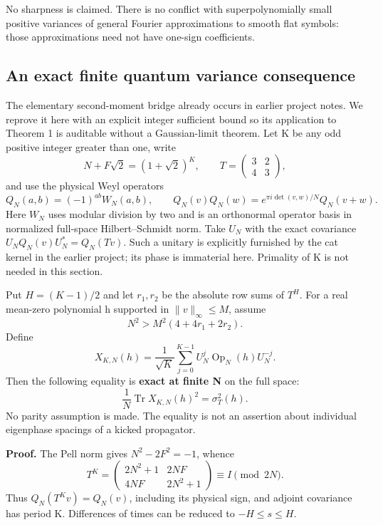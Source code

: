 \] No sharpness is claimed. There is no conflict with superpolynomially small positive variances of general Fourier approximations to smooth flat symbols: those approximations need not have one-sign coefficients.

\subsection{An exact finite quantum variance consequence}\label{nondegeneracy:an-exact-finite-quantum-variance-consequence}

The elementary second-moment bridge already occurs in earlier project notes. We reprove it here with an explicit integer sufficient bound so its application to Theorem 1 is auditable without a Gaussian-limit theorem. Let K be any odd positive integer greater than one, write \[
 N+F\sqrt2=(1+\sqrt2)^K,
 \qquad T=\begin{pmatrix}3&2\\4&3\end{pmatrix},
\] and use the physical Weyl operators \[
 Q_N(a,b)=(-1)^{ab}W_N(a,b),\qquad
 Q_N(v)Q_N(w)=e^{\pi i\det(v,w)/N}Q_N(v+w).
\] Here \(W_N\) uses modular division by two and is an orthonormal operator basis in normalized full-space Hilbert--Schmidt norm. Take \(U_N\) with the exact covariance \(U_NQ_N(v)U_N^*=Q_N(Tv)\). Such a unitary is explicitly furnished by the cat kernel in the earlier project; its phase is immaterial here. Primality of K is not needed in this section.

Put \(H=(K-1)/2\) and let \(r_1,r_2\) be the absolute row sums of \(T^H\). For a real mean-zero polynomial h supported in \(\|v\|_\infty\leq M\), assume \[
                    N^2>M^2(4+4r_1+2r_2).                  \tag{ND.24}
\] Define \[
 X_{K,N}(h)=\frac1{\sqrt K}\sum_{j=0}^{K-1}
                    U_N^j\operatorname{Op}_N(h)U_N^{-j}.
\] Then the following equality is \textbf{exact at finite N} on the full space: \[
             \boxed{\frac1N\operatorname{Tr}X_{K,N}(h)^2
                                  =\sigma_T^2(h).}          \tag{ND.25}
\] No parity assumption is made. The equality is not an assertion about individual eigenphase spacings of a kicked propagator.

\textbf{Proof.} The Pell norm gives \(N^2-2F^2=-1\), whence \[
 T^K=\begin{pmatrix}2N^2+1&2NF\\4NF&2N^2+1\end{pmatrix}
                           \equiv I\pmod{2N}.               \tag{ND.26}
\] Thus \(Q_N(T^Kv)=Q_N(v)\), including its physical sign, and adjoint covariance has period K. Differences of times can be reduced to \(-H\leq s\leq H\).

